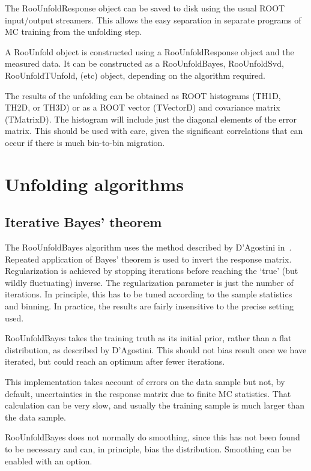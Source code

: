 \documentclass{cernrep}
\begin{document}
The RooUnfoldResponse object can be saved to disk using the usual ROOT input/output
streamers. This allows the easy separation in separate programs
of MC training from the unfolding step.

A RooUnfold object is constructed using a RooUnfoldResponse object and the measured
data. It can be constructed as a RooUnfoldBayes, RooUnfoldSvd, RooUnfoldTUnfold, (etc)
object, depending on the algorithm required.

The results of the unfolding can be obtained as ROOT histograms (TH1D, TH2D, or TH3D)
or as a ROOT vector (TVectorD) and covariance matrix (TMatrixD). The histogram will
include just the diagonal elements of the error matrix. This should be used with care,
given the significant correlations that can occur if there is much bin-to-bin migration.

\section{Unfolding algorithms}

\subsection{Iterative Bayes' theorem}

The RooUnfoldBayes algorithm uses the method described by D'Agostini in~\cite{D'Agostini:1994zf}.
Repeated application of Bayes' theorem is used to invert the response matrix.
Regularization is achieved by stopping iterations before reaching the `true'
(but wildly fluctuating) inverse.
The regularization parameter is just the number of iterations.
In principle, this has to be tuned according to the sample statistics and binning.
In practice, the results are fairly insensitive to the precise setting used.

RooUnfoldBayes takes the training truth as its initial prior, rather than a flat distribution,
as described by D'Agostini.
This should not bias result once we have iterated, but could reach an optimum after fewer iterations.

This implementation takes account of errors on the data sample but not,
by default, uncertainties in the response matrix due to finite MC statistics.
That calculation can be very slow, and usually the training sample is much larger
than the data sample.

RooUnfoldBayes does not normally do smoothing, since this has not been found to be necessary
and can, in principle, bias the distribution. Smoothing can be enabled with an option.
\end{document}
